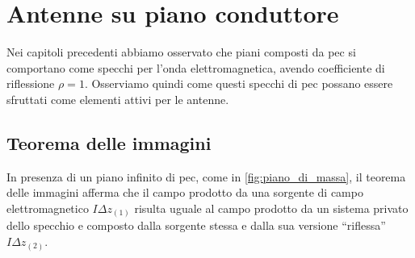 \chapter{Antenne su piano conduttore}

Nei capitoli precedenti abbiamo osservato che piani composti da \gls{pec} si comportano come specchi per l'onda elettromagnetica, avendo coefficiente di riflessione $\rho = 1$.
Osserviamo quindi come questi specchi di \gls{pec} possano essere sfruttati come elementi attivi per le antenne.

\section{Teorema delle immagini}

In presenza di un piano infinito di \gls{pec}, come in \autoref{fig:piano_di_massa}, il teorema delle immagini afferma che il campo prodotto da una sorgente di campo elettromagnetico $I \Delta z_{(1)}$ risulta uguale al campo prodotto da un sistema privato dello specchio e composto dalla sorgente stessa e dalla sua versione ``riflessa'' $I \Delta z_{(2)}$.


